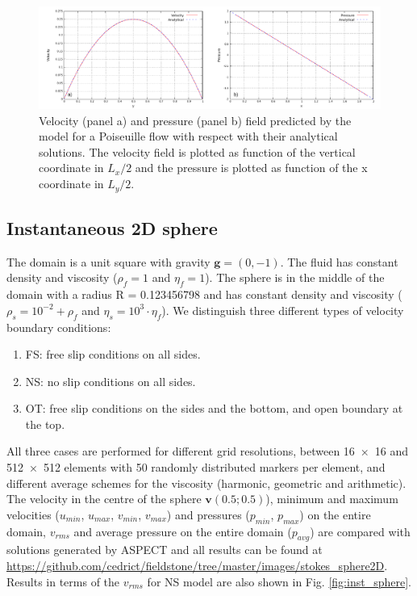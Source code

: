 \documentclass[hidelinks,11pt,a4paper]{article}
\begin{document}
\begin{figure}
\noindent\includegraphics[width=\textwidth]{./Figures/Analytical.pdf}
\caption{Velocity (panel a) and pressure (panel b) field predicted by the model for a Poiseuille flow with respect with their analytical solutions. The velocity field is plotted as function of the vertical coordinate in $L_x/2$ and the pressure is plotted as function of the x coordinate in $L_y/2$.}
\label{fig:poi_plot}
\end{figure}

\subsection{Instantaneous 2D sphere}\label{sec:ist_sphere}
The domain is a unit square with gravity $\bm{g}=(0,-1)$. The fluid has constant density and viscosity ($\rho_f=1$ and $\eta_f=1$). The sphere is in the middle of the domain with a radius R = 0.123456798 and has constant density and viscosity ($\rho_s=10^{-2}+\rho_f$ and $\eta_s=10^3 \cdot \eta_f$).
We distinguish three different types of velocity boundary conditions:
\begin{enumerate}
\item FS: free slip conditions on all sides.
\item NS: no slip conditions on all sides.
\item OT: free slip conditions on the sides and the bottom, and open boundary at the top.
\end{enumerate}
All three cases are performed for different grid resolutions, between \num{16x16} and \num{512x512} elements with 50 randomly distributed markers per element, and different average schemes for the viscosity (harmonic, geometric and arithmetic). The velocity in the centre of the sphere $\bm{v}(0.5;0.5)$), minimum and maximum velocities ($u_{min}$, $u_{max}$, $v_{min}$, $v_{max}$) and pressures ($p_{min}$, $p_{max}$) on the entire domain, $v_{rms}$ and average pressure on the entire domain ($p_{avg}$) are compared with solutions generated by ASPECT \citep{KHB12,heister_aspect_methods2,aspect-doi-v2.2.0,aspectmanual} and all results can be found at \url{https://github.com/cedrict/fieldstone/tree/master/images/stokes_sphere2D}. Results in terms of the $v_{rms}$ for NS model are also shown in Fig. \ref{fig:inst_sphere}.
\end{document}
